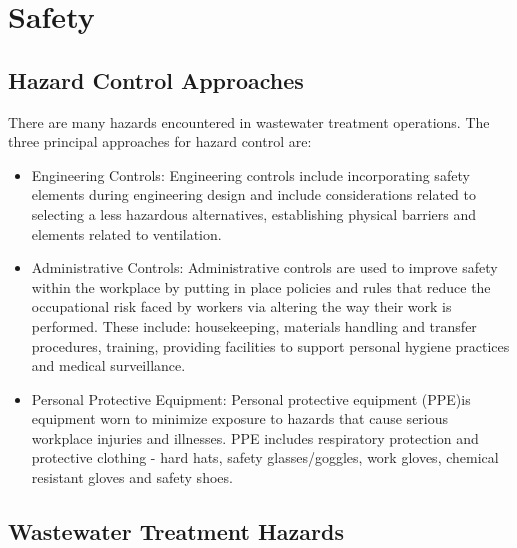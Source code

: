 \chapter{Safety}
\section{Hazard Control Approaches}
There are many hazards encountered in wastewater treatment operations.  
The three principal approaches for hazard control are:
\begin{itemize}
\item Engineering Controls:  Engineering controls include incorporating safety elements during engineering design and include considerations related to selecting a less hazardous alternatives, establishing  physical barriers and elements related to ventilation.
\item Administrative Controls:  Administrative controls are used to improve safety within the workplace by putting in place policies and rules that reduce the occupational risk faced by workers via altering the way their work is performed.  These include: housekeeping, materials handling and transfer procedures, training, providing facilities to support personal hygiene practices and medical surveillance.
\item Personal Protective Equipment: Personal protective equipment (PPE)is equipment worn to minimize exposure to hazards that cause serious workplace injuries and illnesses.  PPE includes respiratory protection and protective clothing - hard hats, safety
glasses/goggles, work gloves, chemical resistant gloves and safety shoes.

\end{itemize}


\section{Wastewater Treatment Hazards}
